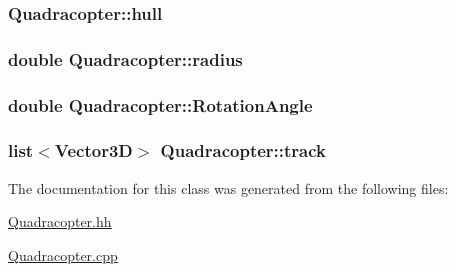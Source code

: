 \subsubsection[{\texorpdfstring{hull}{hull}}]{ Quadracopter\+::hull\hspace{0.3cm}{\ttfamily [private]}}\hypertarget{class_quadracopter_a1bc37defc8b79a02c1abba10e69742a7}{}\label{class_quadracopter_a1bc37defc8b79a02c1abba10e69742a7}
\subsubsection[{\texorpdfstring{radius}{radius}}]{\setlength{\rightskip}{0pt plus 5cm}double Quadracopter\+::radius\hspace{0.3cm}{\ttfamily [private]}}\hypertarget{class_quadracopter_a34736716e6c9c1ef8a73dec7e4dc2485}{}\label{class_quadracopter_a34736716e6c9c1ef8a73dec7e4dc2485}
\subsubsection[{\texorpdfstring{Rotation\+Angle}{RotationAngle}}]{\setlength{\rightskip}{0pt plus 5cm}double Quadracopter\+::\+Rotation\+Angle\hspace{0.3cm}{\ttfamily [private]}}\hypertarget{class_quadracopter_a2d2329d63abb5ff624dc1d95660a08b4}{}\label{class_quadracopter_a2d2329d63abb5ff624dc1d95660a08b4}
\subsubsection[{\texorpdfstring{track}{track}}]{\setlength{\rightskip}{0pt plus 5cm}list$<${\bf Vector3D}$>$ Quadracopter\+::track\hspace{0.3cm}{\ttfamily [private]}}\hypertarget{class_quadracopter_a04bd01dc2756f344af906ffb4f8b6655}{}\label{class_quadracopter_a04bd01dc2756f344af906ffb4f8b6655}


The documentation for this class was generated from the following files\+:\begin{DoxyCompactItemize}
\item 
\hyperlink{_quadracopter_8hh}{Quadracopter.\+hh}\item 
\hyperlink{_quadracopter_8cpp}{Quadracopter.\+cpp}\end{DoxyCompactItemize}
